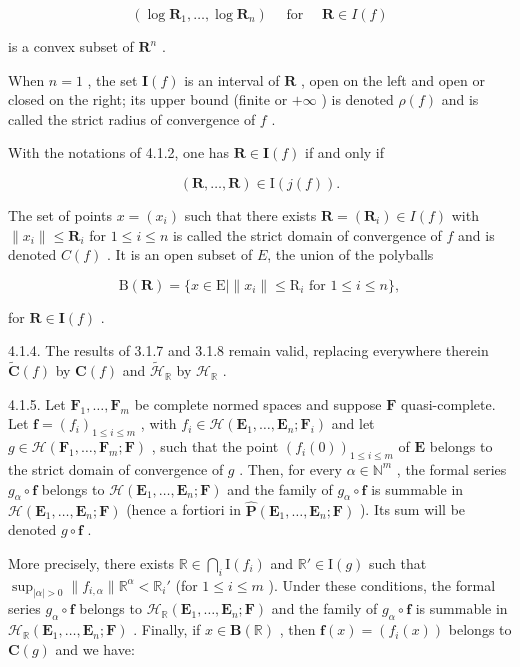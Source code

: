 \[
(\log \mathbf {R} _ {1}, \dots , \log \mathbf {R} _ {n}) \quad \text { for } \quad \mathbf {R} \in I (f)
\]

is a convex subset of \(\mathbf{R}^{n}\) .

When \(n=1\) , the set \(\mathbf{I}(f)\) is an interval of \(\mathbf{R}\) , open on the left and open or closed on the right; its upper bound (finite or \(+\infty\) ) is denoted \(\rho(f)\) and is called the strict radius of convergence of \(f\) .

With the notations of 4.1.2, one has \(\mathbf{R} \in \mathbf{I}(f)\) if and only if

\[
(\mathbf {R}, \dots , \mathbf {R}) \in \mathrm{I} (j (f)).
\]

The set of points \(x = (x_i)\) such that there exists \(\mathbf{R} = (\mathbf{R}_i) \in I(f)\) with \(\| x_i \| \leqslant \mathbf{R}_i\) for \(1 \leqslant i \leqslant n\) is called the strict domain of convergence of \(f\) and is denoted \(C(f)\) . It is an open subset of \(E\), the union of the polyballs

\[
\mathrm{B} (\mathbf {R}) = \{x \in \mathrm{E} | \| x _ {i} \| \leqslant \mathrm{R} _ {i} \text {   for   } 1 \leqslant i \leqslant n \},
\]

for \(\mathbf{R}\in\mathbf{I}(f)\) .

4.1.4. The results of 3.1.7 and 3.1.8 remain valid, replacing everywhere therein \(\tilde{\mathbf{C}}(f)\) by \(\mathbf{C}(f)\) and \(\tilde{\mathcal{H}}_{\mathbb{R}}\) by \(\mathcal{H}_{\mathbb{R}}\) .

4.1.5. Let \(\mathbf{F}_1, \ldots, \mathbf{F}_m\) be complete normed spaces and suppose \(\mathbf{F}\) quasi-complete. Let \(\mathbf{f} = (f_i)_{1 \leqslant i \leqslant m}\) , with \(f_i \in \mathcal{H}(\mathbf{E}_1, \ldots, \mathbf{E}_n; \mathbf{F}_i)\) and let \(g \in \mathcal{H}(\mathbf{F}_1, \ldots, \mathbf{F}_m; \mathbf{F})\) , such that the point \((f_i(0))_{1 \leqslant i \leqslant m}\) of \(\mathbf{E}\) belongs to the strict domain of convergence of \(g\) . Then, for every \(\alpha \in \mathbb{N}^m\) , the formal series \(g_\alpha \circ \mathbf{f}\) belongs to \(\mathcal{H}(\mathbf{E}_1, \ldots, \mathbf{E}_n; \mathbf{F})\) and the family of \(g_\alpha \circ \mathbf{f}\) is summable in \(\mathcal{H}(\mathbf{E}_1, \ldots, \mathbf{E}_n; \mathbf{F})\) (hence a fortiori in \(\hat{\mathbf{P}}(\mathbf{E}_1, \ldots, \mathbf{E}_n; \mathbf{F})\) ). Its sum will be denoted \(g \circ \mathbf{f}\) .

More precisely, there exists \(\mathbb{R} \in \bigcap_{i} \mathrm{I}(f_i)\) and \(\mathbb{R}' \in \mathrm{I}(g)\) such that \(\sup_{|\alpha| > 0} \| f_{i,\alpha} \| \mathbb{R}^{\alpha} < \mathbb{R}_i'\) (for \(1 \leqslant i \leqslant m\) ). Under these conditions, the formal series \(g_{\alpha} \circ \mathbf{f}\) belongs to \(\mathcal{H}_{\mathbb{R}}(\mathbf{E}_1, \ldots, \mathbf{E}_n; \mathbf{F})\) and the family of \(g_{\alpha} \circ \mathbf{f}\) is summable in \(\mathcal{H}_{\mathbb{R}}(\mathbf{E}_1, \ldots, \mathbf{E}_n; \mathbf{F})\) . Finally, if \(x \in \mathbf{B}(\mathbb{R})\) , then \(\mathbf{f}(x) = (f_i(x))\) belongs to \(\mathbf{C}(g)\) and we have:

